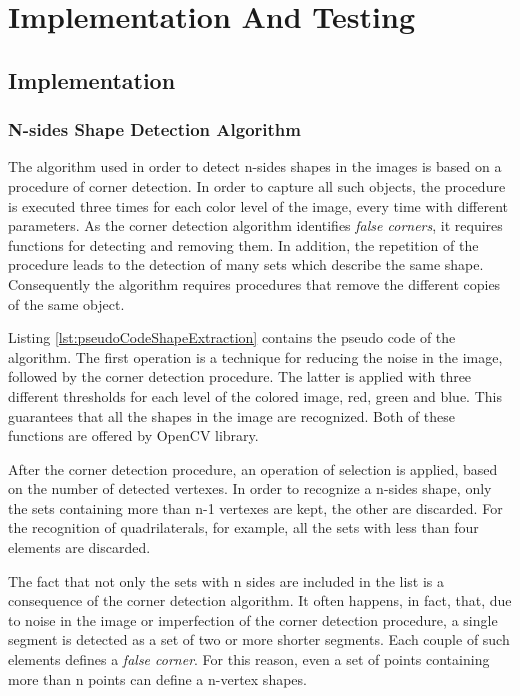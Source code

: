 \chapter{Implementation And Testing}\label{impl_test}
	
	\section{Implementation}
	
		\subsection{N-sides Shape Detection Algorithm}
		The algorithm used in order to detect n-sides shapes in the images is based on a procedure of corner detection. 
		In order to capture all such objects, the procedure is executed three times for each color level of the image, every time with different parameters.
		As the corner detection algorithm identifies \emph{false corners}, it requires functions for detecting and removing them. 
		In addition, the repetition of the procedure leads to the detection of many sets which describe the same shape.	
		Consequently the algorithm requires procedures that remove the different copies of the same object.


		
		Listing \ref{lst:pseudoCodeShapeExtraction} contains the pseudo code of the algorithm.
		The first operation is a technique for reducing the noise in the image, followed by the corner detection procedure.
		The latter is applied with three different thresholds for each level of the colored image, red, green and blue.
		This guarantees that all the shapes in the image are recognized.
		Both of these functions are offered by \mbox{OpenCV} library.

		
		After the corner detection procedure, an operation of selection is applied, based on the number of detected vertexes.
		In order to recognize a n-sides shape, only the sets containing more than n-1 vertexes are kept, the other are discarded.
		For the recognition of quadrilaterals, for example, all the sets with less than four elements are discarded.
		


		The fact that not only the sets with n sides are included in the list is a consequence of the corner detection algorithm. 
		It often happens, in fact, that, due to noise in the image or imperfection of the corner detection procedure, a single segment is detected as a set of two or more shorter segments. 
		Each couple of such elements defines a \emph{false corner}. 
		For this reason, even a set of points containing more than n points can define a n-vertex shapes. 


